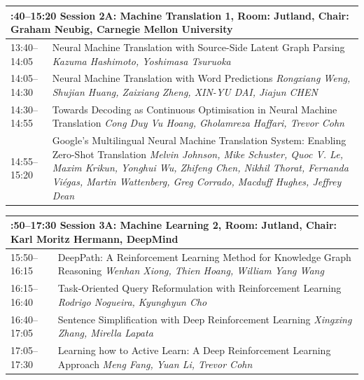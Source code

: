\documentclass{book}
\renewcommand{\large}{\fontsize{36}{40}\selectfont}
\begin{document}
\begin{tabular}{p{3in}p{16in}}
  \multicolumn{2}{p{\textwidth}}{\bfseries\large 13:40--15:20 Session 2A: Machine Translation 1, Room:  Jutland, Chair:  Graham Neubig, Carnegie Mellon University} \\\hline

    
    13:40--14:05
    &	Neural Machine Translation with Source-Side Latent Graph Parsing \newline 
    {\itshape Kazuma Hashimoto, Yoshimasa Tsuruoka} \\
    
    14:05--14:30
    &	Neural Machine Translation with Word Predictions \newline 
    {\itshape Rongxiang Weng, Shujian Huang, Zaixiang Zheng, XIN-YU DAI, Jiajun CHEN} \\
    
    14:30--14:55
    &	Towards Decoding as Continuous Optimisation in Neural Machine Translation \newline 
    {\itshape Cong Duy Vu Hoang, Gholamreza Haffari, Trevor Cohn} \\
    
    14:55--15:20
    &	Google's Multilingual Neural Machine Translation System: Enabling Zero-Shot Translation \newline 
    {\itshape Melvin Johnson, Mike Schuster, Quoc V. Le, Maxim Krikun, Yonghui Wu, Zhifeng Chen, Nikhil Thorat, Fernanda Viégas, Martin Wattenberg, Greg Corrado, Macduff Hughes, Jeffrey Dean} \\
    
\end{tabular}

\begin{tabular}{p{3in}p{16in}}
  \multicolumn{2}{p{\textwidth}}{\bfseries\large 15:50--17:30 Session 3A: Machine Learning 2, Room:  Jutland, Chair:  Karl Moritz Hermann, DeepMind} \\\hline

    
    15:50--16:15
    &	DeepPath: A Reinforcement Learning Method for Knowledge Graph Reasoning \newline 
    {\itshape Wenhan Xiong, Thien Hoang, William Yang Wang} \\
    
    16:15--16:40
    &	Task-Oriented Query Reformulation with Reinforcement Learning \newline 
    {\itshape Rodrigo Nogueira, Kyunghyun Cho} \\
    
    16:40--17:05
    &	Sentence Simplification with Deep Reinforcement Learning \newline 
    {\itshape Xingxing Zhang, Mirella Lapata} \\
    
    17:05--17:30
    &	Learning how to Active Learn: A Deep Reinforcement Learning Approach \newline 
    {\itshape Meng Fang, Yuan Li, Trevor Cohn} \\
    
\end{tabular}
\end{document}
